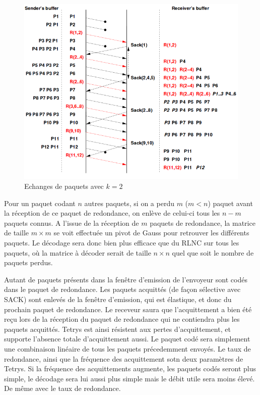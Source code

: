 \documentclass[frenchb]{article}
\begin{document}
\begin{figure}
  \centering
  \includegraphics[scale=0.5]{img/Tetrys.png}
  \caption{Echanges de paquets avec $k=2$}
  \label{fig:sub3}
\end{figure}


Pour un paquet codant $n$ autres paquets, si on a perdu $m$ ($m<n$) paquet avant la réception de ce paquet de redondance, on enlève de celui-ci tous les $n-m$ paquets connus. A l'issue de la réception de $m$ paquets de redondance, la matrice de taille $m\times m$ se voit effectuée un pivot de Gauss pour retrouver les différents paquets. Le décodage sera donc bien plus efficace que du RLNC sur tous les paquets, où la matrice à décoder serait de taille $n\times n$ quel que soit le nombre de paquets perdus. 

Autant de paquets présents dans la fenêtre d'emission de l'envoyeur sont codés dans le paquet de redondance. Les paquets acquittés (de façon sélective avec SACK) sont enlevés de la fenêtre d'emission, qui est élastique, et donc du prochain paquet de redondance. Le receveur saura que l'acquittement a bien été reçu lors de la réception du paquet de redondance qui ne contiendra plus les paquets acquittés.
Tetrys est ainsi résistent aux pertes d'acquittement, et supporte l'absence totale d'acquittement aussi. Le paquet codé sera simplement une combinaison linéaire de tous les paquets précedemment envoyés.
Le taux de redondance, ainsi que la fréquence des acquittement sotn deux paramètres de Tetrys. Si la fréquence des acquittements augmente, les paquets codés seront plus simple, le décodage sera lui aussi plus simple mais le débit utile sera moins élevé. De même avec le taux de redondance.
\end{document}
